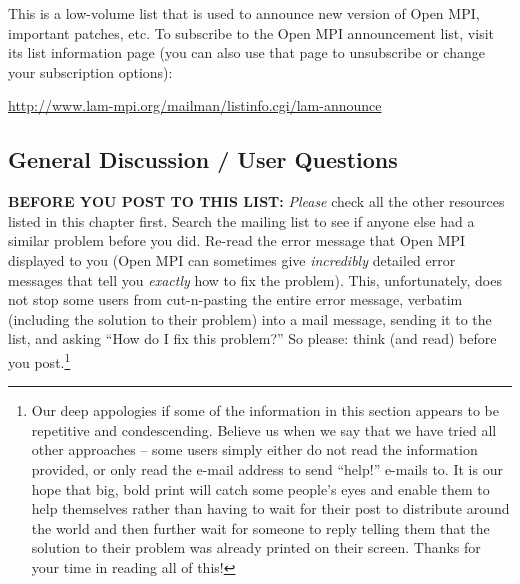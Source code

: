 This is a low-volume list that is used to announce new version of
Open MPI, important patches, etc.  To subscribe to the Open MPI announcement
list, visit its list information page (you can also use that page to
unsubscribe or change your subscription options):

\vspace{11pt}

\centerline{\url{http://www.lam-mpi.org/mailman/listinfo.cgi/lam-announce}}
  
\vspace{11pt}

  

\subsection{General Discussion / User Questions}
  
{\bf BEFORE YOU POST TO THIS LIST:} {\em Please} check all the other
resources listed in this chapter first.  Search the mailing list to
see if anyone else had a similar problem before you did.  Re-read the
error message that Open MPI displayed to you (Open MPI can sometimes give {\em
  incredibly} detailed error messages that tell you {\em exactly} how
to fix the problem).  This, unfortunately, does not stop some users
from cut-n-pasting the entire error message, verbatim (including the
solution to their problem) into a mail message, sending it to the
list, and asking ``How do I fix this problem?''  So please: think (and
read) before you post.\footnote{Our deep appologies if some of the
  information in this section appears to be repetitive and
  condescending.  Believe us when we say that we have tried all other
  approaches -- some users simply either do not read the information
  provided, or only read the e-mail address to send ``help!'' e-mails
  to.  It is our hope that big, bold print will catch some people's
  eyes and enable them to help themselves rather than having to wait
  for their post to distribute around the world and then further wait
  for someone to reply telling them that the solution to their problem
  was already printed on their screen.  Thanks for your time in
  reading all of this!}

\vspace{11pt}
  

